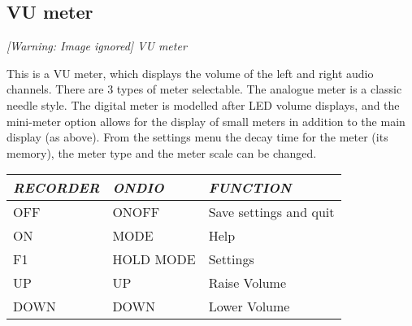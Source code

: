 \subsection{VU meter}
{\centering\itshape
  [Warning: Image ignored] %
 \newline
VU meter
\par}

This is a VU meter, which displays the volume of the left and right
audio channels. There are 3 types of meter selectable.  The analogue
meter is a classic needle style.  The digital meter is modelled after
LED volume displays, and the mini{}-meter option allows for the display
of small meters in addition to the main display (as above).  From the
settings menu the decay time for the meter (its memory), the meter type
and the meter scale can be changed. 

\begin{tabular}[c]{|p{2.409cm}|p{2.908cm}|p{4.494cm}|}
\hline
{\centering\bfseries\itshape
RECORDER 
\par}
&
{\centering\bfseries\itshape
ONDIO 
\par}
&
{\centering\bfseries\itshape
FUNCTION 
\par}
\\\hline
{\centering
OFF 
\par}
&
{\centering
ONOFF 
\par}
&
Save settings and quit 
\\\hline
{\centering
ON 
\par}
&
{\centering
MODE 
\par}
&
Help 
\\\hline
{\centering
F1 
\par}
&
{\centering
HOLD MODE 
\par}
&
Settings 
\\\hline
{\centering
UP 
\par}
&
{\centering
UP 
\par}
&
Raise Volume 
\\\hline
{\centering
DOWN 
\par}
&
{\centering
DOWN 
\par}
&
Lower Volume 
\\\hline
\end{tabular}

